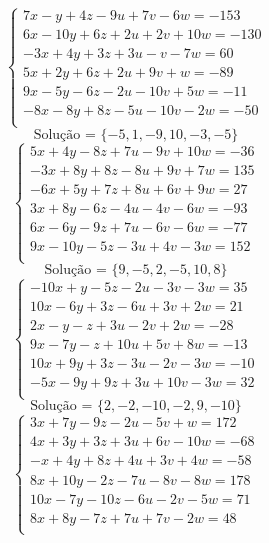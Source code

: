 \documentclass[12pt,oneside,a4paper]{article}
\begin{document}
\vspace{\baselineskip}
\begin{equation*}
\begin{cases}
7x-y+4z-9u+7v-6w=-153 \\
6x-10y+6z+2u+2v+10w=-130 \\
-3x+4y+3z+3u-v-7w=60 \\
5x+2y+6z+2u+9v+w=-89 \\
9x-5y-6z-2u-10v+5w=-11 \\
-8x-8y+8z-5u-10v-2w=-50 \\
\end{cases}
\end{equation*}
\begin{equation*}
\text{Solução = }\{-5,1,-9,10,-3,-5\}
\end{equation*}
\vspace{\baselineskip}
\begin{equation*}
\begin{cases}
5x+4y-8z+7u-9v+10w=-36 \\
-3x+8y+8z-8u+9v+7w=135 \\
-6x+5y+7z+8u+6v+9w=27 \\
3x+8y-6z-4u-4v-6w=-93 \\
6x-6y-9z+7u-6v-6w=-77 \\
9x-10y-5z-3u+4v-3w=152 \\
\end{cases}
\end{equation*}
\begin{equation*}
\text{Solução = }\{9,-5,2,-5,10,8\}
\end{equation*}
\vspace{\baselineskip}
\begin{equation*}
\begin{cases}
-10x+y-5z-2u-3v-3w=35 \\
10x-6y+3z-6u+3v+2w=21 \\
2x-y-z+3u-2v+2w=-28 \\
9x-7y-z+10u+5v+8w=-13 \\
10x+9y+3z-3u-2v-3w=-10 \\
-5x-9y+9z+3u+10v-3w=32 \\
\end{cases}
\end{equation*}
\begin{equation*}
\text{Solução = }\{2,-2,-10,-2,9,-10\}
\end{equation*}
\vspace{\baselineskip}
\begin{equation*}
\begin{cases}
3x+7y-9z-2u-5v+w=172 \\
4x+3y+3z+3u+6v-10w=-68 \\
-x+4y+8z+4u+3v+4w=-58 \\
8x+10y-2z-7u-8v-8w=178 \\
10x-7y-10z-6u-2v-5w=71 \\
8x+8y-7z+7u+7v-2w=48 \\
\end{cases}
\end{equation*}
\end{document}
